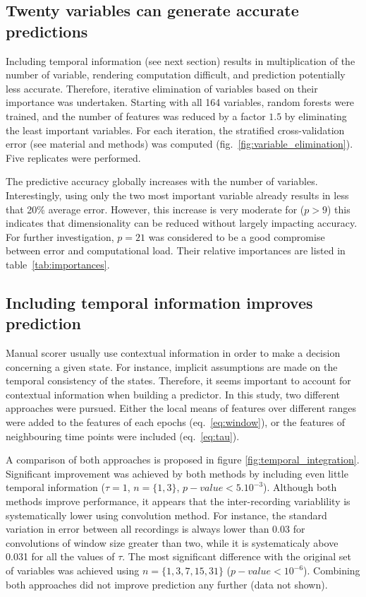 \subsection{Twenty variables can generate accurate predictions}
Including temporal information (see next section) results in multiplication of the number of variable, rendering computation difficult, and prediction potentially less accurate.
Therefore, iterative elimination of variables based on their importance was undertaken.
Starting with all 164 variables, random forests were trained, and the number of features was reduced by a factor $1.5$  by eliminating the least important variables.
For each iteration, the stratified cross-validation error (see material and methods) was computed (fig.~\ref{fig:variable_elimination}). Five replicates were performed.


The predictive accuracy globally increases with the number of variables.
Interestingly, using only the two most important variable already results in less that 20\% average error.
However, this increase is very moderate for ($p>9$) this indicates that dimensionality can be reduced without largely impacting accuracy.
For further investigation, $p=21$ was considered to be a good compromise between error and computational load. Their relative importances are listed in table~\ref{tab:importances}.


\subsection{Including temporal information improves prediction}
Manual scorer usually use contextual information in order to make a decision concerning a given state.
For instance, implicit assumptions are made on the temporal consistency of the states.
Therefore, it seems important to account for contextual information when building a predictor.
In this study, two different approaches were pursued.
Either the local means of features over different ranges were added to the features
of each epochs (eq.~\ref{eq:window}),
or the features of neighbouring time points were included (eq.~\ref{eq:tau}).

A comparison of both approaches is proposed in figure \ref{fig:temporal_integration}.
Significant improvement was achieved by both methods by including even little temporal information ($\tau = 1$, $n=\{1,3\}$, $p-value < 5.10^{-3}$).
Although both methods improve performance, it appears that the inter-recording variablility is systematically lower using convolution method.
For instance, the standard variation in error between all recordings is always lower than 0.03 for convolutions of window size greater than two,
while it is systematicaly above 0.031 for all the values of $\tau$.
The most significant difference with the original set of variables was achieved using $n = \{1,3,7,15,31\}$ ($p-value < 10^{-6}$).
Combining both approaches did not improve prediction any further (data not shown).

